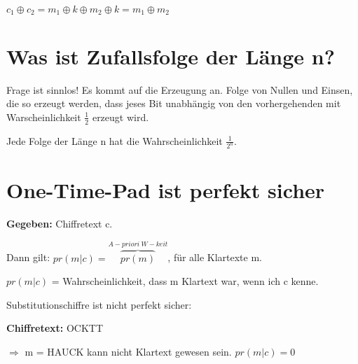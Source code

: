$c_1 \oplus c_2 = m_1 \oplus k \oplus m_2 \oplus k = m_1 \oplus m_2$

\section{Was ist Zufallsfolge der Länge n?}

Frage ist sinnlos! Es kommt auf die Erzeugung an. Folge von Nullen und Einsen, die so erzeugt werden, dass jeses Bit unabhängig von den vorhergehenden mit Warscheinlichkeit $\frac{1}{2}$ erzeugt wird. 

Jede Folge der Länge n hat die Wahrscheinlichkeit $\frac{1}{2^n}$. 

\section{One-Time-Pad ist perfekt sicher}

\textbf{Gegeben:} Chiffretext c.

Dann gilt: $pr(m|c) = \overbrace{pr(m)}^{A-priori\ W-keit}$, für alle Klartexte m.

\par \medskip

$pr(m|c)$ = Wahrscheinlichkeit, dass m Klartext war, wenn ich c kenne.

\par \medskip

Substitutionschiffre ist nicht perfekt sicher:

\textbf{Chiffretext:} OCKTT

$\Rightarrow$ m = HAUCK kann nicht Klartext gewesen sein. $pr(m|c) = 0$